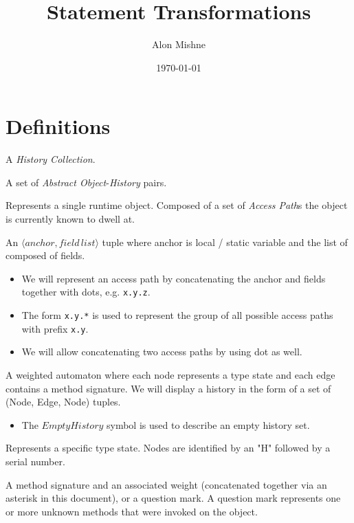 \documentclass{article}
\author{Alon Mishne}
\title{Statement Transformations}
\date{\today}
\begin{document}
\maketitle

\section{Definitions}

\begin{description}
	\label{sec:defs}
	\item[State ($S$)] A \emph{History Collection}.
	\item[HistoryCollection ($HC$)] A set of \emph{Abstract Object}-\emph{History} pairs.
	\item[Abstract Object ($AO$)] Represents a single runtime object. Composed of a set of \emph{Access Path}s the object is currently known to dwell at.
	\item[Access Path ($AP$)] An $\langle anchor, field\,list \rangle$ tuple where anchor is local / static variable and the list of composed of fields.
	\begin{itemize}
		\item We will represent an access path by concatenating the anchor and fields together with dots, e.g. \texttt{x.y.z}.
		\item The form \texttt{x.y.*} is used to represent the group of all possible access paths with prefix \texttt{x.y}.
		\item We will allow concatenating two access paths by using dot as well.
	\end{itemize}
	\item[History ($H$)] A weighted automaton where each node represents a type state and each edge contains a method signature. We will display a history in the form of a set of (Node, Edge, Node) tuples.
	\begin{itemize}
		\item The $EmptyHistory$ symbol is used to describe an empty history set.
	\end{itemize}
	\item[History Node ($N$)] Represents a specific type state. Nodes are identified by an "H" followed by a serial number.
	\item[History Edge ($E$)] A method signature and an associated weight (concatenated together via an asterisk in this document), or a question mark. A question mark represents one or more unknown methods that were invoked on the object.
\end{description}
\end{document}
